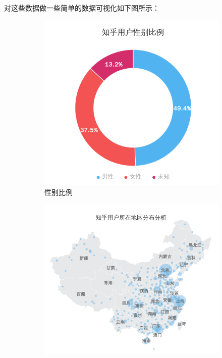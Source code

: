\documentclass[bachelor,adobefonts]{jnuthesis}
\begin{document}
对这些数据做一些简单的数据可视化如下图所示：

\begin{figure}[h!]
  \centering 
  \begin{subfigure}[b]{0.5\linewidth}
    \centering
    \includegraphics[width=\linewidth]{Wyonghu-3.png}
    \caption{性别比例}
  \end{subfigure}
  \begin{subfigure}[b]{0.49\linewidth}
    \centering
    \includegraphics[width=\linewidth]{Wyonghu-2.png}

\end{subfigure}
\end{figure}
\end{document}

